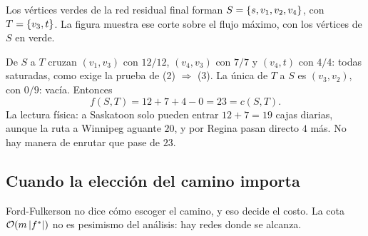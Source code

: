 \documentclass[11pt,letterpaper]{article}
\begin{document}
\begin{ejemplo}\label{ej:flujo-corte-minimo}
  Los vértices verdes de la red residual final forman
  $S = \left\{ s, v_1, v_2, v_4 \right\}$, con $T = \left\{ v_3, t \right\}$. La figura
  muestra ese corte sobre el flujo máximo, con los vértices de $S$ en
  verde.
  \begin{center}
  \end{center}
  De $S$ a $T$ cruzan $(v_1, v_3)$ con $12/12$, $(v_4, v_3)$ con $7/7$
  y $(v_4, t)$ con $4/4$: todas saturadas, como exige la prueba de
  (2) $\Rightarrow$ (3). La única de $T$ a $S$ es $(v_3, v_2)$, con
  $0/9$: vacía. Entonces
  \[
    f(S, T) = 12 + 7 + 4 - 0 = 23 = c(S, T) .
  \]
  La lectura física: a Saskatoon solo pueden entrar $12 + 7 = 19$
  cajas diarias, aunque la ruta a Winnipeg aguante $20$, y por Regina
  pasan directo $4$ más. No hay manera de enrutar que pase de $23$.
\end{ejemplo}


\subsection*{Cuando la elección del camino importa}

Ford-Fulkerson no dice cómo escoger el camino, y eso decide el costo.
La cota $\mathcal{O}\!\left(m \left\lvert f^* \right\rvert\right)$ no es pesimismo del análisis: hay redes
donde se alcanza.
\end{document}
